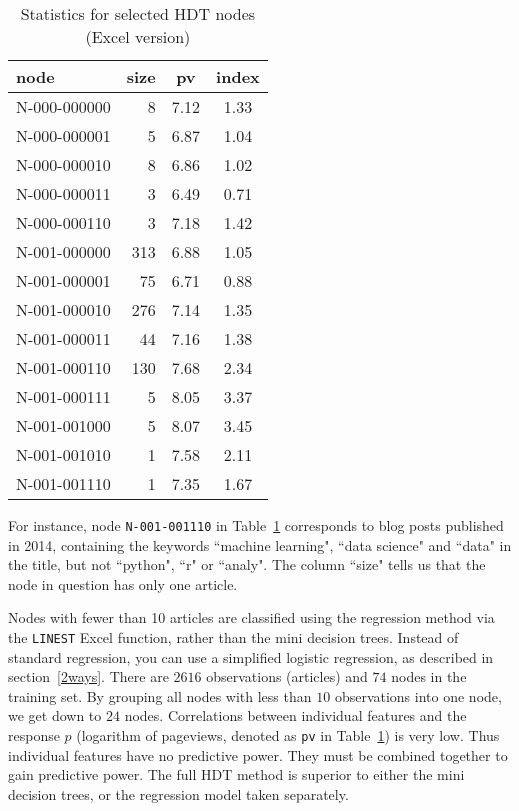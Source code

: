 \documentclass[oneside,10pt]{book}
\renewcommand{\arraystretch}{1.4} %
\begin{document}
\renewcommand{\arraystretch}{1.2} %
\begin{table}%
\begin{center}
\begin{tabular}{lrcc}
\hline
node & size & pv & index \\
\hline
N-000-000000 & 8 & 7.12 & 1.33 \\
N-000-000001 & 5 & 6.87 & 1.04 \\
N-000-000010 & 8 & 6.86 & 1.02 \\
N-000-000011 & 3 & 6.49 & 0.71 \\
N-000-000110 & 3 & 7.18 & 1.42 \\
N-001-000000 & 313 & 6.88 & 1.05 \\
N-001-000001 & 75 & 6.71 & 0.88 \\
N-001-000010 & 276 & 7.14 & 1.35 \\
N-001-000011 & 44 & 7.16 & 1.38 \\
N-001-000110 & 130 & 7.68 & 2.34 \\
N-001-000111 & 5 & 8.05 & 3.37 \\
N-001-001000 & 5 & 8.07 & 3.45 \\
N-001-001010 & 1 & 7.58 & 2.11 \\
N-001-001110 & 1 & 7.35 & 1.67 \\
\hline
\end{tabular}
\caption{\label{fffnode}Statistics for selected HDT nodes (Excel version)}
\end{center}
\end{table}
\renewcommand{\arraystretch}{1.0} %

For instance, node \texttt{N-001-001110} in Table~\ref{fffnode} corresponds to blog posts published in 2014, containing the keywords ``machine learning", ``data science" and ``data" in the title, but not ``python", ``r" or ``analy". The column ``size" tells us that the node in question has only one article.


Nodes with fewer than 10 articles are classified using the regression method via the \texttt{LINEST} Excel function, rather than the mini decision trees. Instead of standard regression, you can use a simplified logistic regression, 
 as described in section~\ref{2ways}. There are $\num{2616}$ observations (articles) and $74$ nodes in the training set. By grouping all nodes with less than $10$ observations into one node, we get down to $24$ nodes. Correlations between individual features and the response $p$ (logarithm of pageviews, denoted as
 \texttt{pv} in Table~\ref{fffnode}) is very low. Thus individual features have no predictive power. They must be combined together
 to gain predictive power. The full HDT method is superior to either the mini decision trees, or the regression model taken separately.
\end{document}
